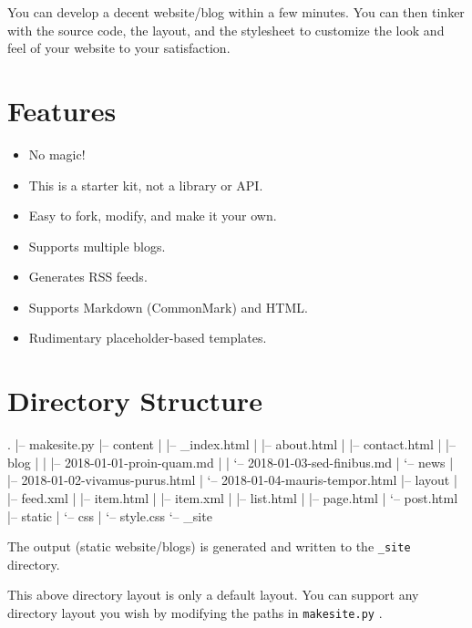 \documentclass[a0]{a0poster}
\newcommand{\inlinecode}[1]{%
    \lstinline{#1}%
}
\begin{document}
\begin{multicols}{4}
    You can develop a decent website/blog within a few minutes. You can
    then tinker with the source code, the layout, and the stylesheet to
    customize the look and feel of your website to your satisfaction.


    \section*{Features}
    \begin{itemize}
        \item
        No magic!

        \item
        This is a starter kit, not a library or API.

        \item
        Easy to fork, modify, and make it your own.

        \item
        Supports multiple blogs.

        \item
        Generates RSS feeds.

        \item
        Supports Markdown (CommonMark) and HTML.

        \item
        Rudimentary placeholder-based templates.
    \end{itemize}


    \section*{Directory Structure}
\begin{plaincode}
.
|-- makesite.py
|-- content
|   |-- _index.html
|   |-- about.html
|   |-- contact.html
|   |-- blog
|   |   |-- 2018-01-01-proin-quam.md
|   |   `-- 2018-01-03-sed-finibus.md
|   `-- news
|       |-- 2018-01-02-vivamus-purus.html
|       `-- 2018-01-04-mauris-tempor.html
|-- layout
|   |-- feed.xml
|   |-- item.html
|   |-- item.xml
|   |-- list.html
|   |-- page.html
|   `-- post.html
|-- static
|   `-- css
|       `-- style.css
`-- _site
\end{plaincode}

    \bigskip

    The output (static website/blogs) is generated and written to the
    \inlinecode{_site} directory.

    This above directory layout is only a default layout. You can
    support any directory layout you wish by modifying the paths in
    \inlinecode{makesite.py}.



\end{multicols}
\end{document}
